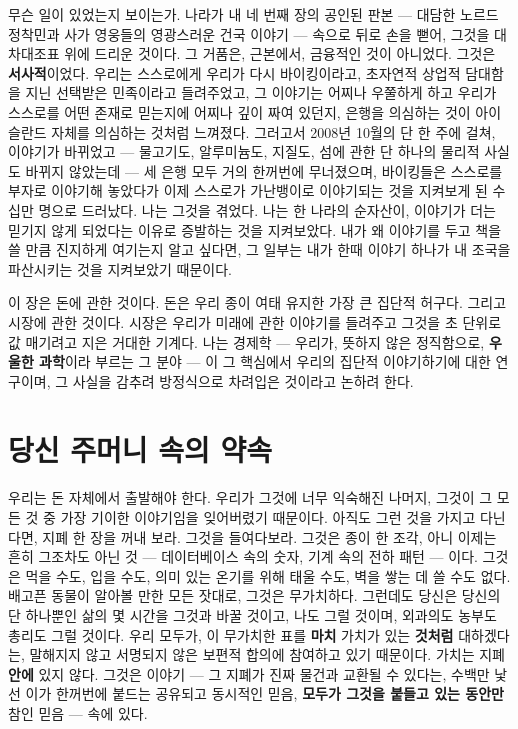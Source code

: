 무슨 일이 있었는지 보이는가. 나라가 내 네 번째 장의 공인된 판본 — 대담한 노르드 정착민과 사가 영웅들의 영광스러운 건국 이야기 — 속으로 뒤로 손을 뻗어, 그것을 대차대조표 위에 드리운 것이다. 그 거품은, 근본에서, 금융적인 것이 아니었다. 그것은 \textbf{서사적}이었다. 우리는 스스로에게 우리가 다시 바이킹이라고, 초자연적 상업적 담대함을 지닌 선택받은 민족이라고 들려주었고, 그 이야기는 어찌나 우쭐하게 하고 우리가 스스로를 어떤 존재로 믿는지에 어찌나 깊이 짜여 있던지, 은행을 의심하는 것이 아이슬란드 자체를 의심하는 것처럼 느껴졌다. 그러고서 2008년 10월의 단 한 주에 걸쳐, 이야기가 바뀌었고 — 물고기도, 알루미늄도, 지질도, 섬에 관한 단 하나의 물리적 사실도 바뀌지 않았는데 — 세 은행 모두 거의 한꺼번에 무너졌으며, 바이킹들은 스스로를 부자로 이야기해 놓았다가 이제 스스로가 가난뱅이로 이야기되는 것을 지켜보게 된 수십만 명으로 드러났다. 나는 그것을 겪었다. 나는 한 나라의 순자산이, 이야기가 더는 믿기지 않게 되었다는 이유로 증발하는 것을 지켜보았다. 내가 왜 이야기를 두고 책을 쓸 만큼 진지하게 여기는지 알고 싶다면, 그 일부는 내가 한때 이야기 하나가 내 조국을 파산시키는 것을 지켜보았기 때문이다.

이 장은 돈에 관한 것이다. 돈은 우리 종이 여태 유지한 가장 큰 집단적 허구다. 그리고 시장에 관한 것이다. 시장은 우리가 미래에 관한 이야기를 들려주고 그것을 초 단위로 값 매기려고 지은 거대한 기계다. 나는 경제학 — 우리가, 뜻하지 않은 정직함으로, \textbf{우울한 과학}이라 부르는 그 분야 — 이 그 핵심에서 우리의 집단적 이야기하기에 대한 연구이며, 그 사실을 감추려 방정식으로 차려입은 것이라고 논하려 한다.

\section*{당신 주머니 속의 약속}

우리는 돈 자체에서 출발해야 한다. 우리가 그것에 너무 익숙해진 나머지, 그것이 그 모든 것 중 가장 기이한 이야기임을 잊어버렸기 때문이다. 아직도 그런 것을 가지고 다닌다면, 지폐 한 장을 꺼내 보라. 그것을 들여다보라. 그것은 종이 한 조각, 아니 이제는 흔히 그조차도 아닌 것 — 데이터베이스 속의 숫자, 기계 속의 전하 패턴 — 이다. 그것은 먹을 수도, 입을 수도, 의미 있는 온기를 위해 태울 수도, 벽을 쌓는 데 쓸 수도 없다. 배고픈 동물이 알아볼 만한 모든 잣대로, 그것은 무가치하다. 그런데도 당신은 당신의 단 하나뿐인 삶의 몇 시간을 그것과 바꿀 것이고, 나도 그럴 것이며, 외과의도 농부도 총리도 그럴 것이다. 우리 모두가, 이 무가치한 표를 \textbf{마치} 가치가 있는 \textbf{것처럼} 대하겠다는, 말해지지 않고 서명되지 않은 보편적 합의에 참여하고 있기 때문이다. 가치는 지폐 \textbf{안에} 있지 않다. 그것은 이야기 — 그 지폐가 진짜 물건과 교환될 수 있다는, 수백만 낯선 이가 한꺼번에 붙드는 공유되고 동시적인 믿음, \textbf{모두가 그것을 붙들고 있는 동안만} 참인 믿음 — 속에 있다.

